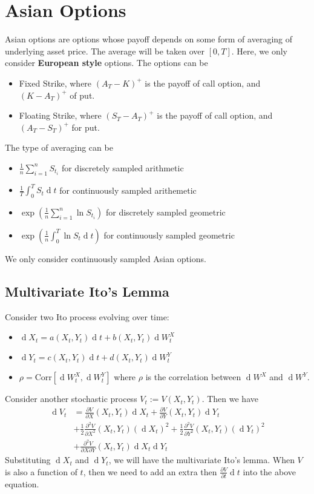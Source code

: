 \documentclass[12pt]{article}
\theoremstyle{definition}
\DeclareMathOperator{\diff}{d}
\begin{document}
\section{Asian Options}
Asian options are options whose payoff depends on some form of averaging of underlying asset price. The average will be taken over $[0,T]$. Here, we only consider \textbf{European style} options.
The options can be 
\begin{itemize}
  \item Fixed Strike, where $(A_T-K)^{+}$ is the payoff of call option, and $(K-A_T)^{+}$ of put.
  \item Floating Strike, where $(S_T-A_T)^{+}$ is the payoff of call option, and $(A_T-S_T)^{+}$ for put.
\end{itemize}
The type of averaging can be
\begin{itemize}
  \item $\frac{1}{n}\sum_{i=1}^n S_{t_i}$ for discretely sampled arithmetic
  \item $\frac{1}{T}\int_0^T S_t\diff t$ for continuously sampled arithemetic
  \item $\exp(\frac{1}{n}\sum_{i=1}^n \ln S_{t_i})$ for discretely sampled geometric
  \item $\exp(\frac{1}{n}\int_0^T \ln S_t\diff t)$ for continuously sampled geometric
\end{itemize}
We only consider continuously sampled Asian options.
\subsection{Multivariate Ito's Lemma}
Consider two Ito process evolving over time:
\begin{itemize}
  \item $\diff X_t=a(X_t,Y_t)\diff t+b(X_t,Y_t)\diff W_t^X$
  \item $\diff Y_t=c(X_t,Y_t)\diff t+d(X_t,Y_t)\diff W_t^Y$
  \item $\rho=\text{Corr}[\diff W_t^X, \diff W_t^Y]$ where $\rho$ is the correlation between $\diff W^X$ and $\diff W^Y$.
\end{itemize}
Consider another stochastic process $V_t:=V(X_t,Y_t)$. Then we have
\begin{align*}
\diff V_t &= \frac{\partial V}{\partial X}(X_t,Y_t)\diff X_t+ \frac{\partial V}{\partial Y}(X_t,Y_t)\diff Y_t\\
&+\frac{1}{2}\frac{\partial^2 V}{\partial X^2}(X_t,Y_t)(\diff X_t)^2+\frac{1}{2}\frac{\partial^2 V}{\partial Y^2}(X_t,Y_t)(\diff Y_t)^2\\
&+\frac{\partial^2 V}{\partial X\partial Y}(X_t,Y_t)\diff X_t\diff Y_t
\end{align*}
Substituting $\diff X_t$ and $\diff Y_t$, we will have the multivariate Ito's lemma. When $V$ is also a function of $t$, then we need to add an extra then $\frac{\partial V}{\partial t}\diff t$ into the above equation.
\end{document}
